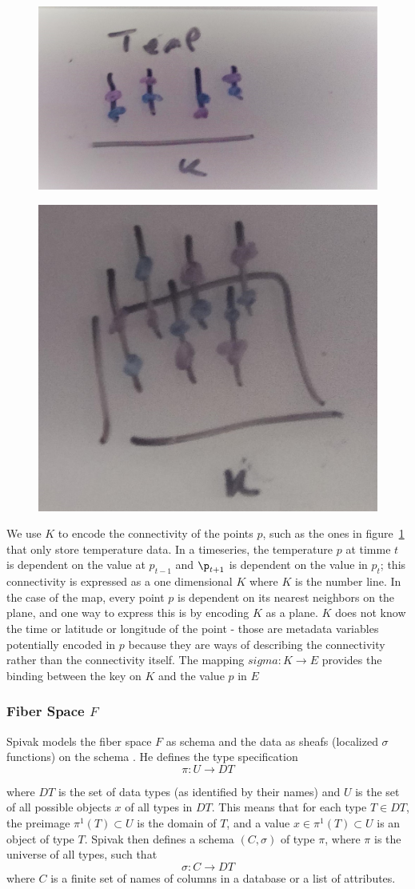 \documentclass[../main.tex]{subfiles}
\begin{document}
\begin{figure}[ht]
    \label{fig:k_data}
    \includegraphics[width=0.2\linewidth]{figures/sections/math/temp_1k.png}
\end{figure}
\begin{figure}[ht]
    \includegraphics[width=0.2\linewidth]{figures/sections/math/temp_2k.png}
\end{figure}

We use $K$ to encode the connectivity of the points $p$, such as the ones in figure~\ref{fig:k_data} that only store temperature data. In a timeseries, the temperature $p$ at timme $t$ is dependent on the value at $p_{t-1}$ and $\p_{t+1}$ is dependent on the value in $p_t$; this connectivity is expressed as a one dimensional $K$ where $K$ is the number line. In the case of the map, every point $p$ is dependent on its nearest neighbors on the plane, and one way to express this is by encoding $K$ as a plane. $K$ does not know the time or latitude or longitude of the point - those are metadata variables potentially encoded in $p$ because they are ways of describing the connectivity rather than the connectivity itself. The mapping $sigma: K \rightarrow E$ provides the binding between the key on $K$ and the value $p$ in $E$ \cite{munznerChDataAbstraction}

\subsubsection{Fiber Space $F$}
Spivak models the fiber space $F$ as schema and the data as sheafs (localized $\sigma$ functions) on the schema \cite{spivakSIMPLICIALDATABASES}. He defines the type specification 
\begin{equation}
\pi: U \rightarrow DT
\end{equation}

where $DT$ is the set of data types (as identified by their names) and $U$ is the set of all possible objects $x$ of all types in $DT$. This means that for each type $T\in DT$, the preimage $\pi^{1}(T)\subset U $ is the domain of $T$, and a value $x \in \pi^{1}(T)\subset U$ is an object of type $T$. Spivak then defines a schema $(C, \sigma)$ of type $\pi$, where $\pi$ is the universe of all types, such that 
\begin{equation}
\sigma: C \rightarrow DT
\end{equation}
where $C$ is a finite set of names of columns in a database or a list of attributes. 
\end{document}
